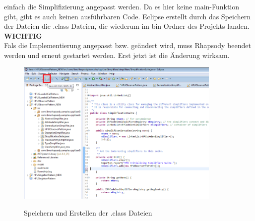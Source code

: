 einfach die Simplifizierung angepasst werden. Da es hier keine main-Funktion
gibt, gibt es auch keinen ausführbaren Code. Eclipse erstellt durch das
Speichern der Dateien die .class-Dateien, die wiederum im bin-Ordner des
Projekts landen.\\ 
\textbf{WICHTIG}\\
Fals die Implementierung angepasst bzw. geändert wird, muss
Rhapsody beendet werden und erneut gestartet werden. Erst jetzt ist die Änderung
wirksam.  
\begin{figure}[H]
	\centering
	\includegraphics[width=0.88\textwidth]{content/pictures/install/saveBin.png}
	\label{pic:bild}
    \caption{Speichern und Erstellen der .class Dateien}
\end{figure} 




